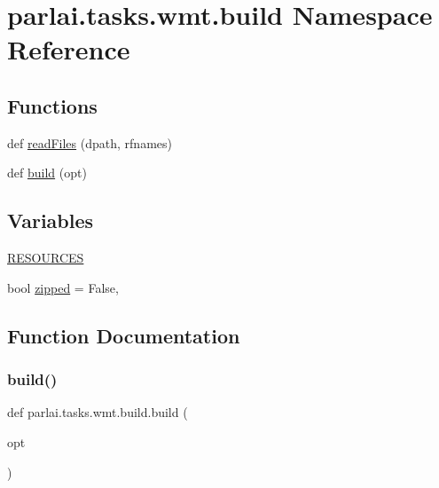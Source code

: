 \hypertarget{namespaceparlai_1_1tasks_1_1wmt_1_1build}{}\section{parlai.\+tasks.\+wmt.\+build Namespace Reference}
\label{namespaceparlai_1_1tasks_1_1wmt_1_1build}
\subsection*{Functions}
\begin{DoxyCompactItemize}
\item 
def \hyperlink{namespaceparlai_1_1tasks_1_1wmt_1_1build_a192eab3c7b1241809a1c134d54a9933f}{read\+Files} (dpath, rfnames)
\item 
def \hyperlink{namespaceparlai_1_1tasks_1_1wmt_1_1build_a824777527357c539f3e9d748efaa2f57}{build} (opt)
\end{DoxyCompactItemize}
\subsection*{Variables}
\begin{DoxyCompactItemize}
\item 
\hyperlink{namespaceparlai_1_1tasks_1_1wmt_1_1build_a1d3c055b42a6d2afdc77be3068414bae}{R\+E\+S\+O\+U\+R\+C\+ES}
\item 
bool \hyperlink{namespaceparlai_1_1tasks_1_1wmt_1_1build_a57b7ea8cd94546ecabb37c23515d739b}{zipped} = False,
\end{DoxyCompactItemize}


\subsection{Function Documentation}
\mbox{\label{namespaceparlai_1_1tasks_1_1wmt_1_1build_a824777527357c539f3e9d748efaa2f57}} 
\subsubsection{\texorpdfstring{build()}{build()}}
{\footnotesize\ttfamily def parlai.\+tasks.\+wmt.\+build.\+build (\begin{DoxyParamCaption}\item[{}]{opt }\end{DoxyParamCaption})}



